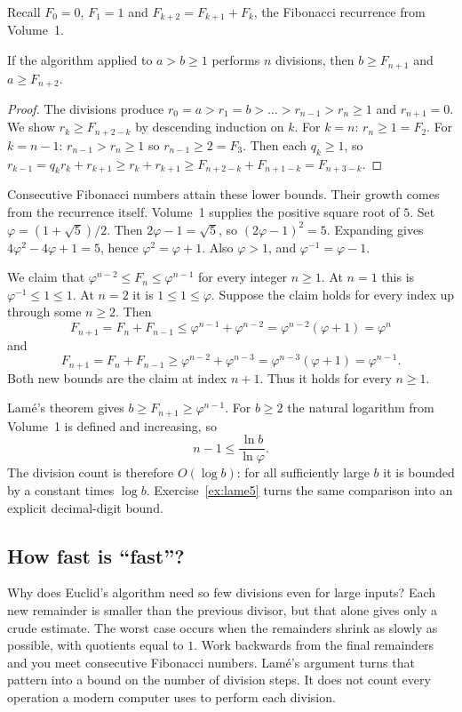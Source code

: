 Recall $F_0=0$, $F_1=1$ and $F_{k+2}=F_{k+1}+F_k$, the Fibonacci recurrence from Volume~1.

\begin{theorem}[Lam\'e]\label{thm:lame}
If the algorithm applied to $a>b\ge1$ performs $n$ divisions, then $b\ge F_{n+1}$ and $a\ge F_{n+2}$.
\end{theorem}
\begin{proof}
The divisions produce $r_0=a>r_1=b>\dots>r_{n-1}>r_n\ge1$ and $r_{n+1}=0$. We show $r_k\ge F_{n+2-k}$ by descending induction on $k$. For $k=n$: $r_n\ge1=F_2$. For $k=n-1$: $r_{n-1}>r_n\ge1$ so $r_{n-1}\ge2=F_3$. Then each $q_k\ge1$, so $r_{k-1}=q_kr_k+r_{k+1}\ge r_k+r_{k+1}\ge F_{n+2-k}+F_{n+1-k}=F_{n+3-k}$.
\end{proof}

Consecutive Fibonacci numbers attain these lower bounds. Their growth comes from the recurrence itself. Volume~1 supplies the positive square root of $5$. Set $\varphi=(1+\sqrt5)/2$. Then $2\varphi-1=\sqrt5$, so $(2\varphi-1)^2=5$. Expanding gives $4\varphi^2-4\varphi+1=5$, hence $\varphi^2=\varphi+1$. Also $\varphi>1$, and $\varphi^{-1}=\varphi-1$.

We claim that $\varphi^{n-2}\le F_n\le\varphi^{n-1}$ for every integer $n\ge1$. At $n=1$ this is $\varphi^{-1}\le1\le1$. At $n=2$ it is $1\le1\le\varphi$. Suppose the claim holds for every index up through some $n\ge2$. Then
\[
F_{n+1}=F_n+F_{n-1}\le\varphi^{n-1}+\varphi^{n-2}=\varphi^{n-2}(\varphi+1)=\varphi^n
\]
and
\[
F_{n+1}=F_n+F_{n-1}\ge\varphi^{n-2}+\varphi^{n-3}=\varphi^{n-3}(\varphi+1)=\varphi^{n-1}.
\]
Both new bounds are the claim at index $n+1$. Thus it holds for every $n\ge1$.

Lam\'e's theorem gives $b\ge F_{n+1}\ge\varphi^{n-1}$. For $b\ge2$ the natural logarithm from Volume~1 is defined and increasing, so
\[
n-1\le\frac{\ln b}{\ln\varphi}.
\]
The division count is therefore $O(\log b)$: for all sufficiently large $b$ it is bounded by a constant times $\log b$. Exercise~\ref{ex:lame5} turns the same comparison into an explicit decimal-digit bound.

\subsection*{How fast is “fast”?}
Why does Euclid's algorithm need so few divisions even for large inputs? Each new remainder is smaller than the previous divisor, but that alone gives only a crude estimate. The worst case occurs when the remainders shrink as slowly as possible, with quotients equal to $1$. Work backwards from the final remainders and you meet consecutive Fibonacci numbers. Lam\'e's argument turns that pattern into a bound on the number of division steps. It does not count every operation a modern computer uses to perform each division.

